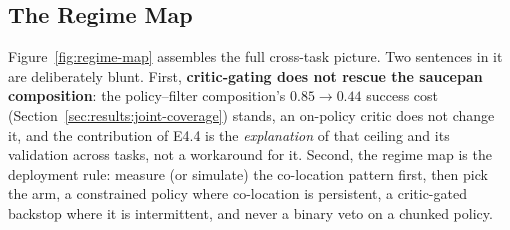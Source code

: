 \documentclass[11pt,a4paper]{report}
\begin{document}
\subsection{The Regime Map}

Figure~\ref{fig:regime-map} assembles
the full cross-task picture. Two sentences in it are deliberately
blunt. First, \textbf{critic-gating does not rescue the saucepan
composition}: the policy--filter composition's $0.85 \to 0.44$
success cost (Section~\ref{sec:results:joint-coverage}) stands, an
on-policy critic does not change it, and the contribution of E4.4 is
the \emph{explanation} of that ceiling and its validation across
tasks, not a workaround for it. Second, the regime map is the
deployment rule: measure (or simulate) the co-location pattern
first, then pick the arm, a constrained policy where co-location is
persistent, a critic-gated backstop where it is intermittent, and
never a binary veto on a chunked policy.
\end{document}
